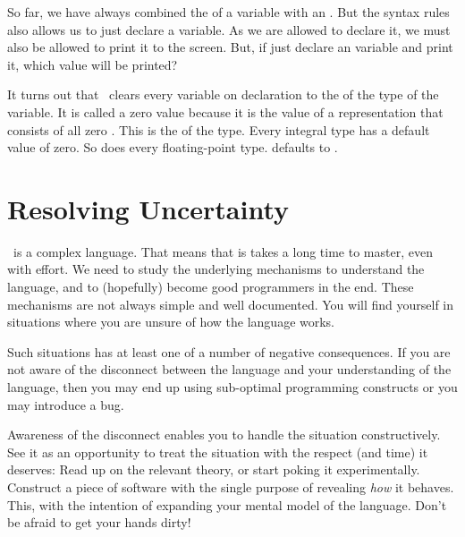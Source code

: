 So far, we have always combined the  of a variable with an . But the syntax rules also allows us to just declare a variable. As we are allowed to declare it, we must also be allowed to print it to the screen. But, if just declare an  variable and print it, which value will be printed?

It turns out that \csharp\ clears every variable on declaration to the  of the type of the variable. It is called a zero value because it is the value of a representation that consists of all zero . This is the  of the type. Every integral type has a default value of zero. So does every floating-point type.  defaults to .

\section{Resolving Uncertainty}

\csharp\ is a complex language. That means that is takes a long time to master, even with effort. We need to study the underlying mechanisms to understand the language, and to (hopefully) become good programmers in the end. These mechanisms are not always simple and well documented. You will find yourself in situations where you are unsure of how the language works.

Such situations has at least one of a number of negative consequences. If you are not aware of the disconnect between the language and your understanding of the language, then you may end up using sub-optimal programming constructs or you may introduce a bug.

Awareness of the disconnect enables you to handle the situation constructively. See it as an opportunity to treat the situation with the respect (and time) it deserves: Read up on the relevant theory, or start poking it experimentally. Construct a piece of software with the single purpose of revealing \textsl{how} it behaves. This, with the intention of expanding your mental model of the language. Don't be afraid to get your hands dirty!


